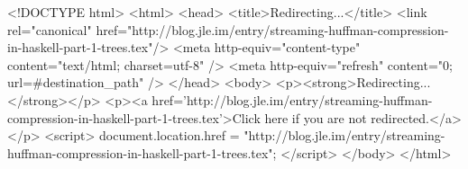 <!DOCTYPE html>
<html>
<head>
<title>Redirecting...</title>
<link rel="canonical" href="http://blog.jle.im/entry/streaming-huffman-compression-in-haskell-part-1-trees.tex"/>
<meta http-equiv="content-type" content="text/html; charset=utf-8" />
<meta http-equiv="refresh" content="0; url=#{destination_path}" />
</head>
<body>
  <p><strong>Redirecting...</strong></p>
  <p><a href='http://blog.jle.im/entry/streaming-huffman-compression-in-haskell-part-1-trees.tex'>Click here if you are not redirected.</a></p>
  <script>
    document.location.href = "http://blog.jle.im/entry/streaming-huffman-compression-in-haskell-part-1-trees.tex";
  </script>
</body>
</html>
